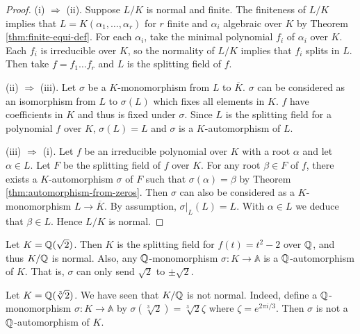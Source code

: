 \begin{proof}
    (i) $\Rightarrow$ (ii). 
    Suppose $L/K$ is normal and finite. The finiteness of $L/K$ implies that $L = K(\alpha_1, \dots, \alpha_r)$ for $r$ finite and $\alpha_i$ algebraic over $K$ by Theorem \ref{thm:finite-equi-def}. For each $\alpha_i$, take the minimal polynomial $f_i$ of $\alpha_i$ over $K$. Each $f_i$ is irreducible over $K$, so the normality of $L/K$ implies that $f_i$ splits in $L$.  Then take $f = f_1 \dots f_r$ and $L$ is the splitting field of $f$.
	
    

    (ii) $\Rightarrow$ (iii). Let $\sigma$ be a $K$-monomorphism from $L$ to $\overline K$. $\sigma$ can be considered as an isomorphism from $L$ to $\sigma(L)$ which fixes all elements in $K$. $f$ have coefficients in $K$ and thus is fixed under $\sigma$. Since $L$ is the splitting field for a polynomial $f$ over $K$, $\sigma(L) = L$ and $\sigma$ is a $K$-automorphism of $L$. 
    
    (iii) $\Rightarrow$ (i). Let $f$ be an irreducible polynomial over $K$ with a root $\alpha$ and let $\alpha \in L$. Let $F$ be the splitting field of $f$ over $K$. For any root $\beta \in F$ of $f$, there exists a $K$-automorphism $\sigma$ of $F $ such that $\sigma(\alpha) = \beta$ by Theorem \ref{thm:automorphism-from-zeros}. Then $\sigma$ can also be considered as a $K$-monomorphism $L \to \overline K$. By assumption, $\sigma|_L(L) = L$. With $\alpha \in L$ we deduce that $\beta \in L$. Hence $L/K$ is normal.
\end{proof}



\begin{example}
	Let $K = \mathbb Q (\sqrt 2)$. Then $K$ is the splitting field for $f(t) = t^2 - 2$ over $\mathbb Q$, and thus $K/ \mathbb Q$ is normal. Also, any $\mathbb Q$-monomorphism $\sigma: K \to \mathbb A$ is a $\mathbb Q$-automorphism of $K$. That is, $\sigma$ can only send $\sqrt 2$ to $\pm \sqrt 2$. 
\end{example}

\begin{example}
	Let $K = \mathbb Q(\sqrt[3]{2})$. We have seen that $K / \mathbb Q$ is not normal. Indeed, define a $\mathbb Q$-monomorphism $\sigma : K \to \mathbb A$ by $\sigma(\sqrt[3]{2}) =  \sqrt[3]{2}\zeta $ where $\zeta = e^{2 \pi i / 3}$. Then $\sigma$ is not a $\mathbb Q$-automorphism of $K$. 
\end{example}



